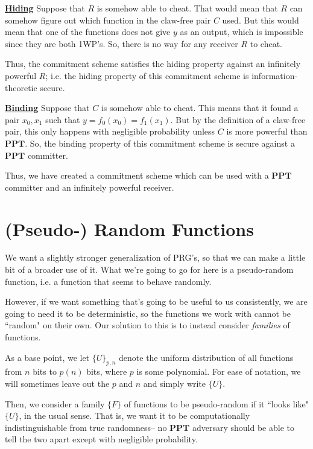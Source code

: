 \documentclass[11pt]{article}
\newcommand{\PPT}{\mathbf{PPT}}
\begin{document}
\textbf{\underline{Hiding}}
Suppose that \(R\) is somehow able to cheat. That would mean that \(R\) can somehow figure out which function in the claw-free pair \(C\) used. But this would mean that one of the functions does not give \(y\) as an output, which is impossible since they are both 1WP's. So, there is no way for any receiver \(R\) to cheat. \smallskip

Thus, the commitment scheme satisfies the hiding property against an infinitely powerful \(R\); i.e. the hiding property of this commitment scheme is information-theoretic secure.\medskip

\textbf{\underline{Binding}}
Suppose that \(C\) is somehow able to cheat. This means that it found a pair \(x_0,x_1\) such that \(y=f_0(x_0)=f_1(x_1)\). But by the definition of a claw-free pair, this only happens with negligible probability unless \(C\) is more powerful than \(\PPT\). So, the binding property of this commitment scheme is secure against a \(\PPT\) committer.\bigskip

Thus, we have created a commitment scheme which can be used with a \(\PPT\) committer and an infinitely powerful receiver.




\newpage
\section{(Pseudo-) Random Functions}

We want a slightly stronger generalization of PRG's, so that we can make a little bit of a broader use of it. What we're going to go for here is a pseudo-random function, i.e. a function that seems to behave randomly.\smallskip

However, if we want something that's going to be useful to us consistently, we are going to need it to be deterministic, so the functions we work with cannot be ``random" on their own. Our solution to this is to instead consider \emph{families} of functions. 

As a base point, we let \(\{U\}_{p,n}\) denote the uniform distribution of all functions from \(n\) bits to \(p(n)\) bits, where \(p\) is some polynomial. For ease of notation, we will sometimes leave out the \(p\) and \(n\) and simply write \(\{U\}\). 

Then, we consider a family \(\{F\}\) of functions to be pseudo-random if it ``looks like" \(\{U\}\), in the usual sense. That is, we want it to be computationally indistinguishable from true randomness-- no \(\PPT\) adversary should be able to tell the two apart except with negligible probability.
\end{document}
